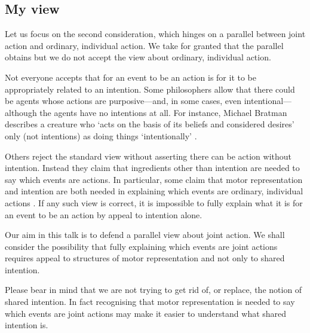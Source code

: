 \documentclass[12pt,\papersize]{extarticle}
\begin{document}
\subsection{My view}
Let us focus on the second consideration, 
which hinges on  a parallel between joint action and ordinary, individual action.
We take for granted that the parallel obtains but we do not accept the view about ordinary, individual action.

Not everyone accepts that for an event to be an action is for it to be appropriately related to an intention.
Some philosophers allow that there could be agents whose actions are purposive---and, in some cases, even intentional---although  the agents have no intentions at all.
For instance, Michael Bratman describes a creature who `acts on the basis of its beliefs and considered desires' only (not intentions) as doing things `intentionally' \citet[p.\ 251]{bratman:2000_valuing}.%

Others reject the standard view without asserting there can be action without intention.
Instead they claim that ingredients other than intention are needed to say which events are actions.
In particular, some claim that motor representation and intention are both needed in explaining which events are ordinary, individual actions \citep{pacherie:2000_content,butterfill:2012_intention}.
If any such view is correct, it is impossible to fully explain what it is for an event to be an action by appeal to intention alone.

Our aim in this talk is to defend a parallel view about joint action. 
We shall consider the possibility that fully explaining which events are joint actions requires appeal to structures of motor representation and not only to shared intention.

Please bear in mind that we are not trying to get rid of, or replace, the notion of shared intention.
In fact recognising that motor representation is needed to say which events are joint actions may make it easier to understand what shared intention is.
\end{document}
